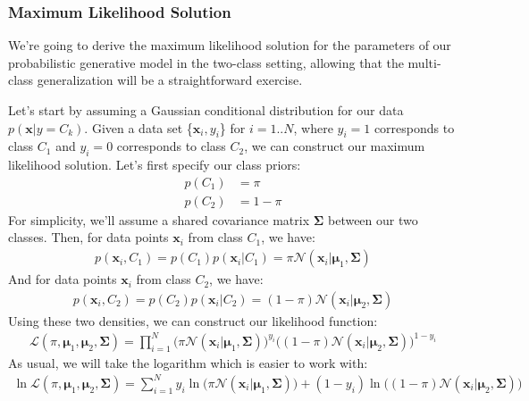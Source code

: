 \subsubsection{Maximum Likelihood Solution}
We're going to derive the maximum likelihood solution for the parameters of our probabilistic generative model in the two-class setting, allowing that the multi-class generalization will be a straightforward exercise.

Let's start by assuming a Gaussian conditional distribution for our data $p(\textbf{x} | y = C_{k})$. Given a data set \{$\textbf{x}_{i}, y_{i}$\} for $i = 1..N$, where $y_{i} = 1$ corresponds to class $C_{1}$ and $y_{i} = 0$ corresponds to class $C_{2}$, we can construct our maximum likelihood solution. Let's first specify our class priors:
\begin{align*}
	p(C_{1}) &= \pi \\
	p(C_{2}) &= 1 - \pi
\end{align*}
For simplicity, we'll assume a shared covariance matrix $\boldsymbol{\Sigma}$ between our two classes. Then, for data points $\textbf{x}_{i}$ from class $C_{1}$, we have:
\begin{align*}
	p(\textbf{x}_{i}, C_{1}) = p(C_{1})p(\textbf{x}_{i}|C_{1}) = \pi\mathcal{N}(\textbf{x}_{i} | \boldsymbol{\mu}_{1}, \boldsymbol{\Sigma})
\end{align*}
And for data points $\textbf{x}_{i}$ from class $C_{2}$, we have:
\begin{align*}
	p(\textbf{x}_{i}, C_{2}) = p(C_{2})p(\textbf{x}_{i}|C_{2}) = (1-\pi)\mathcal{N}(\textbf{x}_{i} | \boldsymbol{\mu}_{2}, \boldsymbol{\Sigma})
\end{align*}
Using these two densities, we can construct our likelihood function:
\begin{align*}
	\mathcal{L}(\pi, \boldsymbol{\mu}_{1}, \boldsymbol{\mu}_{2}, \boldsymbol{\Sigma}) = \prod_{i=1}^{N} \bigg( \pi\mathcal{N}(\textbf{x}_{i} | \boldsymbol{\mu}_{1}, \boldsymbol{\Sigma}) \bigg)^{y_{i}} \bigg( (1-\pi)\mathcal{N}(\textbf{x}_{i} | \boldsymbol{\mu}_{2}, \boldsymbol{\Sigma}) \bigg)^{1 - y_{i}}
\end{align*}
As usual, we will take the logarithm which is easier to work with:
\begin{align*}
	\ln \mathcal{L}(\pi, \boldsymbol{\mu}_{1}, \boldsymbol{\mu}_{2}, \boldsymbol{\Sigma}) = \sum_{i=1}^{N} y_{i} \ln \bigg( \pi\mathcal{N}(\textbf{x}_{i} | \boldsymbol{\mu}_{1}, \boldsymbol{\Sigma}) \bigg) + (1 - y_{i}) \ln \bigg( (1-\pi)\mathcal{N}(\textbf{x}_{i} | \boldsymbol{\mu}_{2}, \boldsymbol{\Sigma}) \bigg)
\end{align*}
